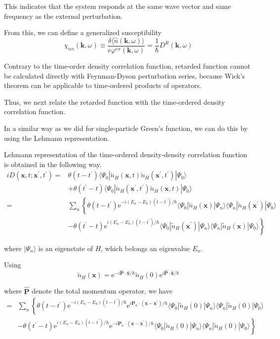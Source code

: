 This indicates that the system responds at the same wave vector and same frequency as the external perturbation.

From this, we can define a generalized susceptibility
\begin{equation*} \label{Eqs3.1.15'} \tag{3.1.15'}
\chi_{nn}(\mathbf{k},\omega) \equiv \frac{\delta \langle \hat{n}(\mathbf{k},\omega) \rangle}{e \varphi^{ex}(\mathbf{k},\omega)} =\frac{1}{\hbar} D^R(\mathbf{k},\omega)
\end{equation*}

Contrary to the time-order density correlation function, retarded function cannot be calculated directly with Feynman-Dyson perturbation series, because Wick's theorem can be applicable to time-ordered products of operators.

Thus, we next relate the retarded function with the time-ordered density correlation function.

In a similar way as we did for single-particle Green's function, we can do this by using the Lehmann representation.

Lehmann representation of the time-ordered density-density correlation function is obtained in the following way.
\[ \begin{split}
i D(\mathbf{x},t;\mathbf{x}^{'},t^{'}) =& \theta(t-t^{'}) \langle \Psi_0 | \tilde{n}_H(\mathbf{x},t) \tilde{n}_H(\mathbf{x}^{'},t^{'}) | \Psi_0 \rangle\\
&+\theta(t^{'}-t) \langle \Psi_0 | \tilde{n}_H(\mathbf{x}^{'},t^{'}) \tilde{n}_H(\mathbf{x},t) | \Psi_0 \rangle\\
=& \sum_n\left\{ \theta(t-t^{'})\mathrm{e}^{-i (E_n-E_0)(t-t^{'})/\hbar} \langle \Psi_0 | \tilde{n}_H(\mathbf{x})|\Psi_n \rangle \langle \Psi_n | \tilde{n}_H(\mathbf{x}^{'})|\Psi_0 \rangle \right.\\
&\left. -\theta(t^{'}-t)\mathrm{e}^{i (E_n-E_0)(t-t^{'})/\hbar} \langle \Psi_0 | \tilde{n}_H(\mathbf{x}^{'})|\Psi_n \rangle \langle \Psi_n | \tilde{n}_H(\mathbf{x})|\Psi_0 \rangle \right\}
\end{split} \]

where $|\Psi_n \rangle$ is an eigenstate of $H$, which belongs an eigenvalue $E_n$.

Using
\[ \tilde{n}_H(\mathbf{x}) = \mathrm{e}^{-i \hat{\mathbf{P}}\cdot\hat{\mathbf{x}}/\hbar} \tilde{n}_H(0)\mathrm{e}^{i\hat{\mathbf{P}} \cdot \hat{\mathbf{x}}/\hbar} \]

where $\hat{\mathbf{P}}$ denote the total momentum operator, we have
\[ \begin{split}
=& \sum_n\left\{ \theta(t-t^{'})\mathrm{e}^{-i (E_n-E_0)(t-t^{'})/\hbar} \mathrm{e}^{i \mathbf{P}_n \cdot (\mathbf{x}-\mathbf{x}^{'})/\hbar} \langle \Psi_0 | \tilde{n}_H(0)|\Psi_n \rangle \langle \Psi_n | \tilde{n}_H(0)|\Psi_0 \rangle \right.\\
&\left. -\theta(t^{'}-t)\mathrm{e}^{i (E_n-E_0)(t-t^{'})/\hbar}  \mathrm{e}^{-i \mathbf{P}_n \cdot (\mathbf{x}-\mathbf{x}^{'})/\hbar} \langle \Psi_0 | \tilde{n}_H(0)|\Psi_n \rangle \langle \Psi_n | \tilde{n}_H(0)|\Psi_0 \rangle \right\}
\end{split} \]

